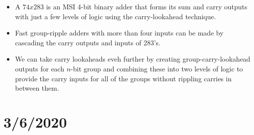\documentclass[10pt,a4paper]{article}
\begin{document}
\begin{itemize}
\item A $74x283$ is an MSI 4-bit binary adder that forms its sum and carry outputs with just a few levels of logic using the carry-lookahead technique. 
\item Fast group-ripple adders with more than four inputs can be made by cascading the carry outputs and inputs of 283's.
\item We can take carry lookaheads eveh further by creating group-carry-lookahead outputs for each $n$-bit group and combining these into two levels of logic to provide the carry inputs for all of the groups without rippling carries in between them. 
\end{itemize}
\pagebreak
\section{3/6/2020}
\end{document}
